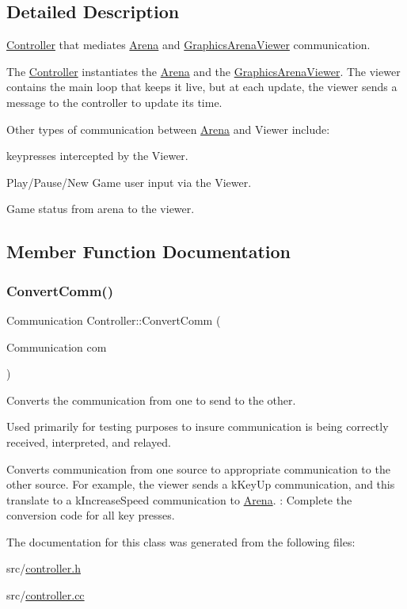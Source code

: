 \subsection{Detailed Description}
\mbox{\hyperlink{class_controller}{Controller}} that mediates \mbox{\hyperlink{class_arena}{Arena}} and \mbox{\hyperlink{class_graphics_arena_viewer}{Graphics\+Arena\+Viewer}} communication. 

The \mbox{\hyperlink{class_controller}{Controller}} instantiates the \mbox{\hyperlink{class_arena}{Arena}} and the \mbox{\hyperlink{class_graphics_arena_viewer}{Graphics\+Arena\+Viewer}}. The viewer contains the main loop that keeps it live, but at each update, the viewer sends a message to the controller to update its time.

Other types of communication between \mbox{\hyperlink{class_arena}{Arena}} and Viewer include\+:
\begin{DoxyItemize}
\item keypresses intercepted by the Viewer.
\item Play/\+Pause/\+New Game user input via the Viewer.
\item Game status from arena to the viewer. 
\end{DoxyItemize}

\subsection{Member Function Documentation}
\mbox{\label{class_controller_ae9b0504ab74cdacc654528b609074adc}} 
\subsubsection{\texorpdfstring{Convert\+Comm()}{ConvertComm()}}
{\footnotesize\ttfamily Communication Controller\+::\+Convert\+Comm (\begin{DoxyParamCaption}\item[{Communication}]{com }\end{DoxyParamCaption})}



Converts the communication from one to send to the other. 

Used primarily for testing purposes to insure communication is being correctly received, interpreted, and relayed.

Converts communication from one source to appropriate communication to the other source. For example, the viewer sends a k\+Key\+Up communication, and this translate to a k\+Increase\+Speed communication to \mbox{\hyperlink{class_arena}{Arena}}. \+: Complete the conversion code for all key presses. 

The documentation for this class was generated from the following files\+:\begin{DoxyCompactItemize}
\item 
src/\mbox{\hyperlink{controller_8h}{controller.\+h}}\item 
src/\mbox{\hyperlink{controller_8cc}{controller.\+cc}}\end{DoxyCompactItemize}
